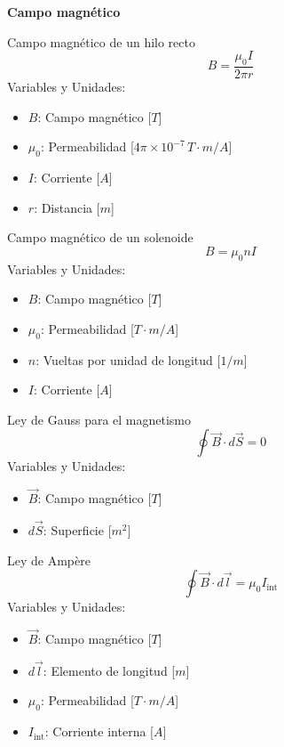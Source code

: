 \begin{landscape}
\begin{multicols}{3}
\end{multicols}

\newpage

\begin{center}
    \LARGE \textbf{Campo magnético}
\end{center}

\begin{multicols}{3}

\begin{teorema}{Campo magnético de un hilo recto}
    $$B = \frac{\mu_0 I}{2\pi r}$$
    Variables y Unidades:
    \begin{itemize}
        \item $B$: Campo magnético [$T$]
        \item $\mu_0$: Permeabilidad [$4\pi \times 10^{-7} \, T\cdot m/A$]
        \item $I$: Corriente [$A$]
        \item $r$: Distancia [$m$]
    \end{itemize}
\end{teorema}

\begin{teorema}{Campo magnético de un solenoide}
    $$B = \mu_0 n I$$
    Variables y Unidades:
    \begin{itemize}
        \item $B$: Campo magnético [$T$]
        \item $\mu_0$: Permeabilidad [$T\cdot m/A$]
        \item $n$: Vueltas por unidad de longitud [$1/m$]
        \item $I$: Corriente [$A$]
    \end{itemize}
\end{teorema}

\begin{teorema}{Ley de Gauss para el magnetismo}
    $$\oint \vec{B} \cdot d\vec{S} = 0$$
    Variables y Unidades:
    \begin{itemize}
        \item $\vec{B}$: Campo magnético [$T$]
        \item $d\vec{S}$: Superficie [$m^2$]
    \end{itemize}
\end{teorema}

\columnbreak

\begin{teorema}{Ley de Ampère}
    $$\oint \vec{B} \cdot d\vec{l} = \mu_0 I_{\text{int}}$$
    Variables y Unidades:
    \begin{itemize}
        \item $\vec{B}$: Campo magnético [$T$]
        \item $d\vec{l}$: Elemento de longitud [$m$]
        \item $\mu_0$: Permeabilidad [$T\cdot m/A$]
        \item $I_{\text{int}}$: Corriente interna [$A$]
    \end{itemize}
\end{teorema}


\end{multicols}
\end{landscape}
